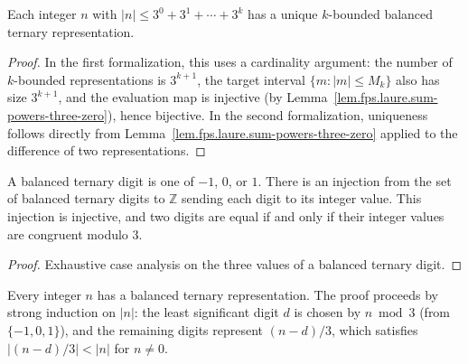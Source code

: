 \begin{lemma}
\label{lem.fps.laure.kbounded-unique}
\leanhelper
\leanok
Each integer $n$ with $|n| \le 3^0 + 3^1 + \cdots + 3^k$ has a unique
$k$-bounded balanced ternary representation.
\end{lemma}

\begin{proof}
\leanok
In the first formalization, this uses a cardinality argument: the number
of $k$-bounded representations is $3^{k+1}$, the target interval
$\{m : |m| \le M_k\}$ also has size $3^{k+1}$, and the evaluation map
is injective (by Lemma~\ref{lem.fps.laure.sum-powers-three-zero}), hence
bijective.
In the second formalization, uniqueness follows directly from
Lemma~\ref{lem.fps.laure.sum-powers-three-zero} applied to the difference
of two representations.
\end{proof}

\begin{lemma}
\label{lem.fps.laure.bt-digit-type}
\leanhelper
\leanok
A balanced ternary digit is one of $-1$, $0$, or $1$.
There is an injection from the set of balanced ternary digits
to $\mathbb{Z}$ sending each digit to its integer value.
This injection is injective, and two digits are equal if and only if
their integer values are congruent modulo $3$.
\end{lemma}

\begin{proof}
Exhaustive case analysis on the three values of a balanced ternary digit.
\end{proof}

\begin{lemma}
\label{lem.fps.laure.bt-exists-inductive}
\leanhelper
\leanok
Every integer $n$ has a balanced ternary representation.
The proof proceeds by strong induction on $|n|$:
the least significant digit $d$ is chosen by $n \bmod 3$
(from $\{-1, 0, 1\}$), and the remaining digits represent
$(n - d)/3$, which satisfies $|(n-d)/3| < |n|$ for $n \ne 0$.
\end{lemma}


